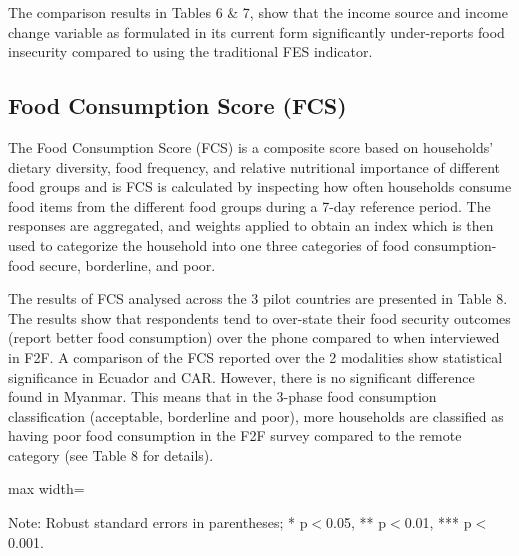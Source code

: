 \documentclass[11pt,harvard]{article}
\begin{document}
The comparison results in Tables 6 \& 7, show that the income source and income change variable as formulated in its current form significantly under-reports food insecurity compared to using the traditional FES indicator.


\clearpage

\subsection{Food Consumption Score (FCS)}

The Food Consumption Score (FCS) is a composite score based on households’ dietary diversity, food frequency, and relative nutritional importance of different food groups and is FCS is calculated by inspecting how often households consume food items from the different food groups during a 7-day reference period. The responses are aggregated, and weights applied to obtain an index which is then used to categorize the household into one three categories of food consumption-food secure, borderline, and poor.

The results of FCS analysed across the 3 pilot countries are presented in Table 8. The results show that respondents tend to over-state their food security outcomes (report better food consumption) over the phone compared to when interviewed in F2F. A comparison of the FCS reported over the 2 modalities show statistical significance in Ecuador and CAR. However, there is no significant difference found in Myanmar. 
This means that in the 3-phase food consumption classification (acceptable, borderline and poor), more households are classified as having poor food consumption in the F2F survey compared to the remote category (see Table 8 for details). 

	\begin{table}[htbp]
		\centering
		\begin{adjustbox}{max width=\textwidth}
			\begin{threeparttable}
				\caption{Impact of Survey Modality on Food Consumption Score and Groups}
				\scriptsize
				 
				\label{tab:FCS_Modality_All_Country}
				\begin{tablenotes}
					\item Note: Robust standard errors in parentheses; * p$<$0.05, ** p$<$0.01, *** p$<$0.001. 
				\end{tablenotes}
			\end{threeparttable}
		\end{adjustbox}
	\end{table}
	
\end{document}

